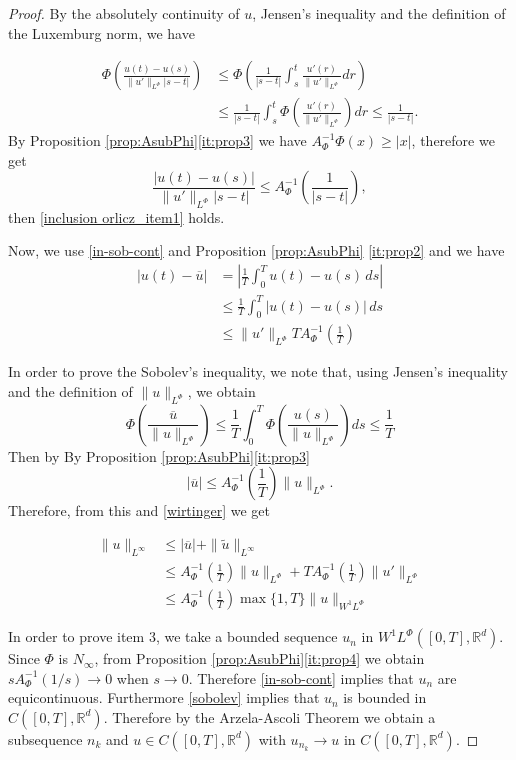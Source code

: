\documentclass[twoside]{article}
\theoremstyle{remark}
\newcommand{\orlnor}{\|_{L^{\Phi}}}
\newcommand{\linf}{\|_{L^{\infty}}}
\newcommand{\lphi}{L^{\Phi}}
\newcommand{\wphi}{W^{1}\lphi}
\newcommand{\sobnor}{\|_{W^{1}\lphi}}
\newcommand{\rr}{\mathbb{R}}
\renewcommand{\leq}{\leqslant}
\renewcommand{\geq}{\geqslant}
\begin{document}
\begin{proof} By the absolutely continuity of $u$, Jensen's inequality and the definition of 
the Luxemburg norm, we have

\[
 \begin{split}
    \Phi\left( \frac{u(t)-u(s)}{\|u'\orlnor |s-t|}\right) &\leq  \Phi\left( \frac{1}{ |s-t|}\int_s^t  \frac{u'(r)}{\|u'\orlnor }dr\right)\\
    &\leq   \frac{1}{ |s-t|}\int_s^t  \Phi\left(\frac{u'(r)}{\|u'\orlnor }\right)dr
    \leq \frac{1}{ |s-t|}.
 \end{split}
\]
By Proposition \ref{prop:AsubPhi}\eqref{it:prop3}  we have $A^{-1}_{\Phi}\Phi(x)\geq |x|$, therefore we get
\[
    \frac{|u(t)-u(s)|}{\|u'\orlnor |s-t|} 
    \leq  A_{\Phi}^{-1}\left(\frac{1}{ |s-t|}\right),
\]
then  \ref{inclusion orlicz_item1} holds.

Now, we use \ref{in-sob-cont} and  Proposition \ref{prop:AsubPhi} \eqref{it:prop2} and we have 
\[\begin{split}
\left|u(t)-\overline {u}\right|&=
\left|\frac{1}{T}\int_0^T u(t)-u(s)\,ds\right|
\\
&\leq \frac{1}{T} \int_0^T |u(t)-u(s)|\,ds
\\
&\leq \|u'\orlnor T A_{\Phi}^{-1}\left(\frac{1}{T}\right)
\end{split}
\] 

In order to prove the Sobolev's inequality, we note that, using Jensen's inequality and 
the definition of $\|u\orlnor$, we obtain
\[ \Phi\left( \frac{ \overline{u}}{\|u\orlnor} \right) \leq
\frac{1}{T}\int_0^T\Phi\left(\frac{u(s)}{\|u\orlnor}\right)ds\leq\frac{1}{T}
\]
Then  by By Proposition \ref{prop:AsubPhi}\eqref{it:prop3} 
\[|\overline{u}|\leq A_{\Phi}^{-1}\left(\frac{1}{T}\right) \|u\orlnor.\]
Therefore, from this and \eqref{wirtinger} we get

\[\begin{split}
 \|u\linf &\leq |\overline{u}|+\|\tilde{u}\linf\\
 &\leq  
 A_{\Phi}^{-1}\left(\frac{1}{T}\right) \|u\orlnor+T A_{\Phi}^{-1}\left(\frac{1}{T}\right)\|u'\orlnor\\
 &\leq A_{\Phi}^{-1}\left(\frac{1}{T}\right)\max\{1,T\}\|u\sobnor
 \end{split}
 \]
 



In order to prove item 3, we take a bounded sequence
$u_n$ in $\wphi\left([0,T],\rr^d\right)$. Since $\Phi$ is $N_{\infty}$, from Proposition \ref{prop:AsubPhi}\eqref{it:prop4}  we obtain $sA_{\Phi}^{-1}(1/s)\to 0$ when $s\to 0$. Therefore \eqref{in-sob-cont} implies that $u_n$ are equicontinuous. Furthermore \eqref{sobolev} implies that $u_n$ is bounded in $C\left([0,T],\rr^d\right)$. Therefore by the Arzela-Ascoli Theorem we  obtain a subsequence $n_k$ and  $u\in C\left([0,T],\rr^d\right)$ with $u_{n_k}\to u$ in $C\left([0,T],\rr^d\right)$.

\end{proof}
\end{document}
